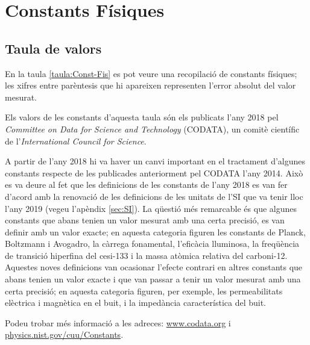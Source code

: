 \chapter{Constants Físiques}\label{sec:const_fis} 

\section{Taula de valors}

En la taula \vref{taula:Const-Fis} es pot veure una recopilació de
constants físiques; les xifres entre parèntesis que hi apareixen representen l'error absolut del valor mesurat.

Els valors de les constants d'aquesta taula són els publicats
l'any 2018 pel \textit{Committee on Data for Science and Technology}
(CODATA), un comitè científic de l'\textit{International Council
for Science}.

A partir de l'any 2018 hi va haver un canvi important en el tractament d'algunes constants respecte de les publicades anteriorment pel CODATA l'any 2014. Això es va deure al fet que les definicions de les constants de l'any 2018 es van fer d'acord amb la renovació de les definicions de les unitats de l'SI que va tenir lloc l'any 2019 (vegeu l'apèndix \ref{sec:SI}). La qüestió més remarcable és que algunes constants que abans tenien un valor mesurat amb una certa precisió, es van definir amb un valor exacte; en aquesta categoria figuren les constants de Planck, Boltzmann i Avogadro, la càrrega fonamental, l'eficàcia lluminosa, la freqüència de transició hiperfina del cesi-133 i la massa atòmica relativa del carboni-12. Aquestes noves definicions van ocasionar l'efecte contrari en altres constants que abans tenien un valor exacte i que van passar a tenir un valor mesurat amb una certa precisió; en aquesta categoria figuren, per exemple, les permeabilitats elèctrica i magnètica en el buit, i la impedància característica del buit.

Podeu trobar  més informació a
les adreces: \href{http://www.codata.org/}{www.codata.org} i \href{http://physics.nist.gov/cuu/Constants/}{physics.nist.gov/cuu/Constants}.

